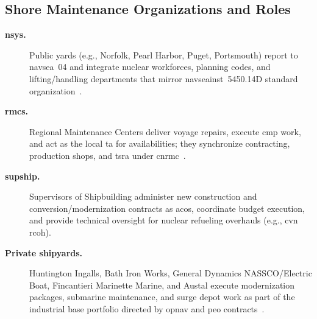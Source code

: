 \documentclass[../main.tex]{subfiles}
\begin{document}
\subsection{Shore Maintenance Organizations and Roles}
\begin{description}
  \item[\textbf{\acp{nsy}.}] Public yards (e.g., Norfolk, Pearl Harbor, Puget, Portsmouth) report to \ac{navsea}~04 and integrate nuclear workforces, planning codes, and lifting/handling departments that mirror \ac{navseainst}~5450.14D standard organization~\autocite{NAVSEAINST5450-14D}.
  \item[\textbf{\acp{rmc}.}] Regional Maintenance Centers deliver voyage repairs, execute \ac{cmp} work, and act as the local \ac{ta} for availabilities; they synchronize contracting, production shops, and \ac{tsra} under \ac{cnrmc}~\autocite{NAVSEAINST5450-145A,edo-4-1-1-fleet-maint-assets-2025}.
\item[\textbf{\ac{supship}.}] Supervisors of Shipbuilding administer new construction and conversion/modernization contracts as \acp{aco}, coordinate budget execution, and provide technical oversight for nuclear refueling overhauls (e.g., \ac{cvn} \ac{rcoh})\autocite{NAVSEAINST5450-145A,edo-4-1-1-fleet-maint-assets-2025,navsea-org-chart-2025}.
  \item[\textbf{Private shipyards.}] Huntington Ingalls, Bath Iron Works, General Dynamics NASSCO/Electric Boat, Fincantieri Marinette Marine, and Austal execute modernization packages, submarine maintenance, and surge depot work as part of the industrial base portfolio directed by \ac{opnav} and \ac{peo} contracts~\autocite{edo-4-1-1-fleet-maint-assets-2025}.
\end{description}

\clearpage
\end{document}
